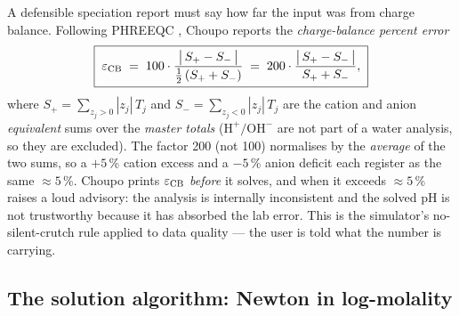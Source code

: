 \documentclass[11pt,a4paper]{article}
\begin{document}
A defensible speciation report must say how far the input was from charge
balance.  Following PHREEQC \cite{Parkhurst2013}, Choupo reports the
\emph{charge-balance percent error}
\begin{equation}
   \boxed{\;
   \varepsilon_{\rm CB} \;=\; 100 \cdot
   \frac{\bigl|\,S_+ - S_-\,\bigr|}{\tfrac12\,(S_+ + S_-)}
   \;=\; 200 \cdot
   \frac{\bigl|\,S_+ - S_-\,\bigr|}{S_+ + S_-},
   \;}
   \label{eq:percent-error}
\end{equation}
where $S_+ = \sum_{z_j>0} |z_j|\,T_j$ and $S_- = \sum_{z_j<0}
|z_j|\,T_j$ are the cation and anion \emph{equivalent} sums over the
\emph{master totals} ($\text{H}^+/\text{OH}^-$ are not part of a water
analysis, so they are excluded).  The factor 200 (not 100) normalises by
the \emph{average} of the two sums, so a $+5$\,\% cation excess and a
$-5$\,\% anion deficit each register as the same $\approx 5$\,\%.  Choupo
prints $\varepsilon_{\rm CB}$ \emph{before} it solves, and when it
exceeds $\approx 5$\,\% raises a loud advisory: the analysis is
internally inconsistent and the solved pH is not trustworthy because it
has absorbed the lab error.  This is the simulator's no-silent-crutch
rule applied to data quality --- the user is told what the number is
carrying.

\subsection{The solution algorithm: Newton in log-molality}
\end{document}

